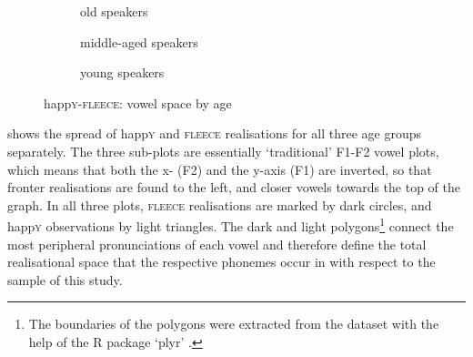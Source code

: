 \begin{figure}
	
	\begin{subfigure}{.49\textwidth}
		
			\resizebox{\linewidth}{!}{} 
		\caption{old speakers}
		\label{fig.happy.space.old}
	\end{subfigure}
	
	\begin{subfigure}{.49\textwidth}
		
			\resizebox{\linewidth}{!}{} 
		\caption{middle-aged speakers}
		\label{fig.happy.space.mid}
	\end{subfigure}
	\begin{subfigure}{.49\textwidth}
		
			\resizebox{\linewidth}{!}{} 
		\caption{young speakers}
		\label{fig.happy.space.young}
	\end{subfigure}
	\caption{happ\textsc{y}-\textsc{fleece}: vowel space by age}
	\label{fig.happy.space}
\end{figure}

 shows the spread of happ\textsc{y} and \textsc{fleece} realisations for all three age groups separately.
The three sub-plots are essentially `traditional' F1-F2 vowel plots, which means that both the x- (F2) and the y-axis (F1) are inverted, so that fronter realisations are found to the left, and closer vowels towards the top of the graph.
In all three plots, \textsc{fleece} realisations are marked by dark circles, and happ\textsc{y} observations by light triangles.
The dark and light polygons\footnote{The boundaries of the polygons were extracted from the dataset with the help of the R package `plyr' \parencite{plyr}.} connect the most peripheral pronunciations of each vowel and therefore define the total realisational space that the respective phonemes occur in with respect to the sample of this study.

